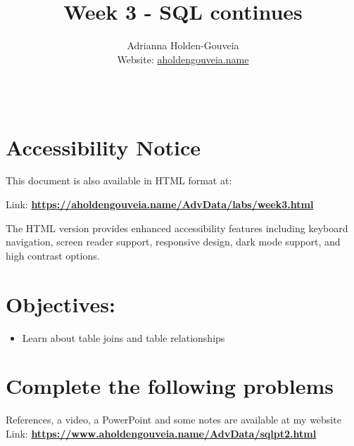 \documentclass[12pt]{article}
\title{Week 3 - SQL continues}
\author{
        Adrianna Holden-Gouveia \\
        Website: \href{https://aholdengouveia.name}{aholdengouveia.name}\\ 
        \date{\vspace{-5ex}}
        \faGithub {: aholdengouveia} \\
        }
\begin{document}
    

\maketitle



\section*{Accessibility Notice}
This document is also available in HTML format at:

Link: \href{https://aholdengouveia.name/AdvData/labs/week3.html}{\textbf{https://aholdengouveia.name/AdvData/labs/week3.html}}

The HTML version provides enhanced accessibility features including keyboard navigation, screen reader support, responsive design, dark mode support, and high contrast options.

\section*{Objectives:}
\begin{itemize}
    \item Learn about table joins and table relationships
\end{itemize}
\section*{Complete the following problems}

References, a video, a PowerPoint and some notes are available at my website
Link: \href{https://www.aholdengouveia.name/AdvData/sqlpt2.html}{\textbf{https://www.aholdengouveia.name/AdvData/sqlpt2.html}}
\end{document}
